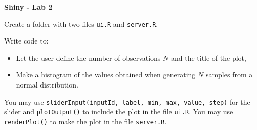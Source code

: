 \documentclass[letterpaper, 12pt]{article}
\begin{document}
\begin{center}
\textbf{\Large{Shiny - Lab 2}}
\end{center}

\vspace{2em}

Create a folder with two files \verb|ui.R| and \verb|server.R|.

\vspace{1em}

Write code to:
\begin{itemize}
	\item Let the user define the number of observations $N$ and the title of the plot,
	\item Make a histogram of the values obtained when generating $N$ samples from a normal distribution.
\end{itemize}

\vspace{1em}

You may use \verb|sliderInput(inputId, label, min, max, value, step)| for the slider and \verb|plotOutput()| to include the plot in the file \verb|ui.R|. You may use \verb|renderPlot()| to make the plot in the file \verb|server.R|.
 
\end{document}
